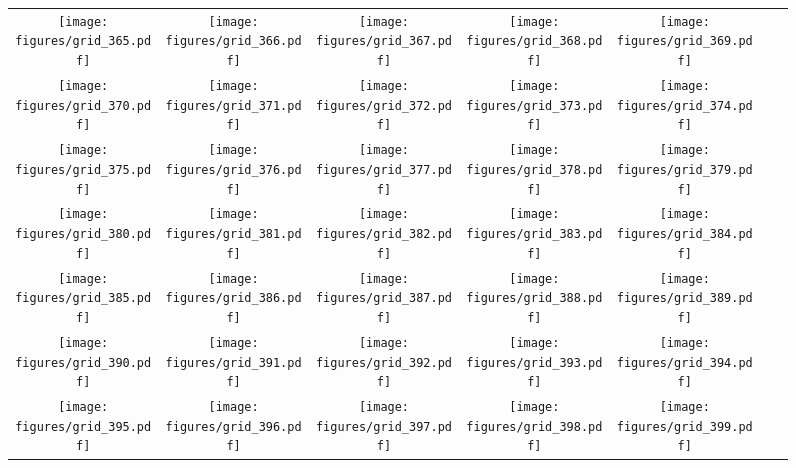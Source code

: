 \documentclass[runningheads]{llncs}
\begin{document}
\newpage

\begin{figure}[H]
\centering
\begin{tabular}{ccccccc}
  \texttt{[image: figures/grid\_365.pdf]} & \texttt{[image: figures/grid\_366.pdf]} & \texttt{[image: figures/grid\_367.pdf]} & \texttt{[image: figures/grid\_368.pdf]} & \texttt{[image: figures/grid\_369.pdf]} \\
  \texttt{[image: figures/grid\_370.pdf]} & \texttt{[image: figures/grid\_371.pdf]} & \texttt{[image: figures/grid\_372.pdf]} & \texttt{[image: figures/grid\_373.pdf]} & \texttt{[image: figures/grid\_374.pdf]} \\ \texttt{[image: figures/grid\_375.pdf]} & \texttt{[image: figures/grid\_376.pdf]} & \texttt{[image: figures/grid\_377.pdf]} & \texttt{[image: figures/grid\_378.pdf]} & \texttt{[image: figures/grid\_379.pdf]} \\
  \texttt{[image: figures/grid\_380.pdf]} & \texttt{[image: figures/grid\_381.pdf]} & \texttt{[image: figures/grid\_382.pdf]} & \texttt{[image: figures/grid\_383.pdf]} & \texttt{[image: figures/grid\_384.pdf]} \\
  \texttt{[image: figures/grid\_385.pdf]} & \texttt{[image: figures/grid\_386.pdf]} & \texttt{[image: figures/grid\_387.pdf]} & \texttt{[image: figures/grid\_388.pdf]} & \texttt{[image: figures/grid\_389.pdf]} \\
  \texttt{[image: figures/grid\_390.pdf]} & \texttt{[image: figures/grid\_391.pdf]} & \texttt{[image: figures/grid\_392.pdf]} & \texttt{[image: figures/grid\_393.pdf]} & \texttt{[image: figures/grid\_394.pdf]} \\
  \texttt{[image: figures/grid\_395.pdf]} & \texttt{[image: figures/grid\_396.pdf]} & \texttt{[image: figures/grid\_397.pdf]} & \texttt{[image: figures/grid\_398.pdf]} & \texttt{[image: figures/grid\_399.pdf]} 

\end{tabular}
\end{figure}
\end{document}
